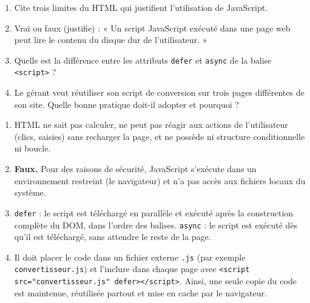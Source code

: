 \documentclass[11pt]{article}
\begin{document}
\begin{exercice}
\begin{enumerate}
    \item Cite trois limites du HTML qui justifient l'utilisation de JavaScript.
    \item Vrai ou faux (justifie) : « Un script JavaScript exécuté dans une page web peut lire le contenu du disque dur de l'utilisateur. »
    \item Quelle est la différence entre les attributs \texttt{defer} et \texttt{async} de la balise \texttt{<script>} ?
    \item Le gérant veut réutiliser son script de conversion sur trois pages différentes de son site. Quelle bonne pratique doit-il adopter et pourquoi ?
\end{enumerate}
\end{exercice}

\begin{corrige}[Exercice]
\begin{enumerate}
    \item HTML ne sait pas calculer, ne peut pas réagir aux actions de l'utilisateur (clics, saisies) sans recharger la page, et ne possède ni structure conditionnelle ni boucle.
    \item \textbf{Faux.} Pour des raisons de sécurité, JavaScript s'exécute dans un environnement restreint (le navigateur) et n'a pas accès aux fichiers locaux du système.
    \item \texttt{defer} : le script est téléchargé en parallèle et exécuté après la construction complète du DOM, dans l'ordre des balises. \texttt{async} : le script est exécuté dès qu'il est téléchargé, sans attendre le reste de la page.
    \item Il doit placer le code dans un fichier externe \texttt{.js} (par exemple \texttt{convertisseur.js}) et l'inclure dans chaque page avec \texttt{<script src="convertisseur.js" defer></script>}. Ainsi, une seule copie du code est maintenue, réutilisée partout et mise en cache par le navigateur.
\end{enumerate}
\end{corrige}
\end{document}
